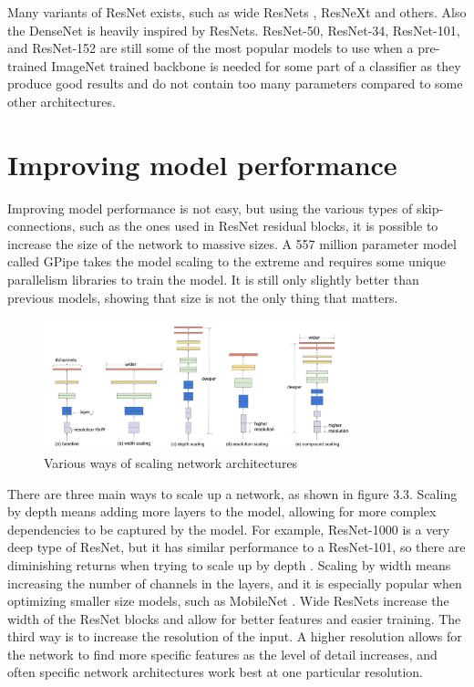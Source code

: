 Many variants of ResNet exists, such as wide ResNets \citep{wideResNet}, ResNeXt \citep{resNext} and others. Also the DenseNet \citep{denseNet} is heavily inspired by ResNets. ResNet-50, ResNet-34, ResNet-101, and ResNet-152 are still some of the most popular models to use when a pre-trained ImageNet trained backbone is needed for some part of a classifier as they produce good results and do not contain too many parameters compared to some other architectures.

\section{Improving model performance}
Improving model performance is not easy, but using the various types of skip-connections, such as the ones used in ResNet residual blocks, it is possible to increase the size of the network to massive sizes. A 557 million parameter model called GPipe \citep{gPipe} takes the model scaling to the extreme and requires some unique parallelism libraries to train the model. It is still only slightly better than previous models, showing that size is not the only thing that matters.

\begin{figure}[h!]
    \centering
    \includegraphics[width=0.8\textwidth]{imgs/scaling-networks.png}
    \caption{Various ways of scaling network architectures \citep{efficientNet}}
\end{figure}

There are three main ways to scale up a network, as shown in figure 3.3. Scaling by depth means adding more layers to the model, allowing for more complex dependencies to be captured by the model. For example, ResNet-1000 is a very deep type of ResNet, but it has similar performance to a ResNet-101, so there are diminishing returns when trying to scale up by depth \citep{efficientNet}. Scaling by width means increasing the number of channels in the layers, and it is especially popular when optimizing smaller size models, such as MobileNet \citep{mobileNet}. Wide ResNets \citep{wideResNet} increase the width of the ResNet blocks and allow for better features and easier training. The third way is to increase the resolution of the input. A higher resolution allows for the network to find more specific features as the level of detail increases, and often specific network architectures work best at one particular resolution.

